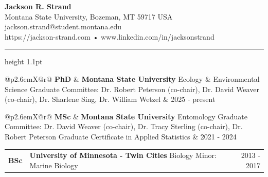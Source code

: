 \documentclass[10pt,letterpaper]{article}
\newcommand{\cvsection}[1]{\par\vspace{11pt}{\large\bfseries\MakeUppercase{#1}}\par\vspace{1pt}\hrule height 1.1pt\vspace{6pt}\nopagebreak[4]}
\begin{document}
\begin{center}{\LARGE\bfseries Jackson R. Strand}\\[4pt]
Montana State University, Bozeman, MT 59717 USA \\[1pt] jackson.strand@student.montana.edu \\[1pt] https://jackson-strand.com • www.linkedin.com/in/jacksonstrand\end{center}
\vspace{4pt}\noindent{}

\cvsection{Education}
\begin{tabularx}{\linewidth}{@{}p{2.6em}X@{\hspace{0.8em}}r@{}}
\textbf{PhD} & \textbf{Montana State University} \newline \hspace{1.2em}Ecology \& Environmental Science \newline \hspace{1.2em}Graduate Committee: Dr. Robert Peterson (co-chair), Dr. David Weaver (co-chair), Dr. Sharlene Sing, Dr. William Wetzel & 2025 - present \\
\end{tabularx}\vspace{5pt}
\begin{tabularx}{\linewidth}{@{}p{2.6em}X@{\hspace{0.8em}}r@{}}
\textbf{MSc} & \textbf{Montana State University} \newline \hspace{1.2em}Entomology \newline \hspace{1.2em}Graduate Committee: Dr. David Weaver (co-chair), Dr. Tracy Sterling (co-chair), Dr. Robert Peterson \newline \hspace{1.2em}Graduate Certificate in Applied Statistics & 2021 - 2024 \\
\end{tabularx}\vspace{5pt}
\begin{tabularx}{\linewidth}{@{}p{2.6em}X@{\hspace{0.8em}}r@{}}
\textbf{BSc} & \textbf{University of Minnesota - Twin Cities} \newline \hspace{1.2em}Biology \newline \hspace{1.2em}Minor: Marine Biology & 2013 - 2017 \\
\end{tabularx}\vspace{5pt}
\end{document}
